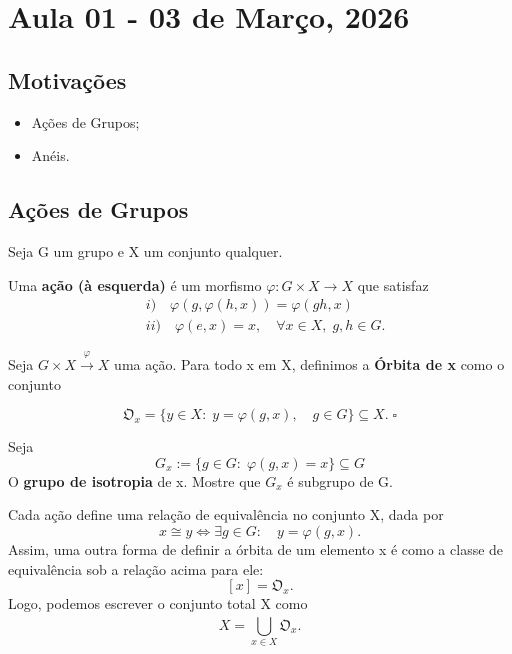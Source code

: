 \documentclass[../algebraIII_notes.tex]{subfiles}
\begin{document}
\section{Aula 01 - 03 de Março, 2026}
\subsection{Motivações}
\begin{itemize}
	\item Ações de Grupos;
	\item Anéis.
\end{itemize}
\subsection{Ações de Grupos}
Seja G um grupo e X um conjunto qualquer.
\begin{def*}
	Uma \textbf{ação (à esquerda)} é um morfismo \(\varphi :G\times X\rightarrow X\) que satisfaz
	\begin{align*}
		 & i)\quad \varphi (g, \varphi (h, x)) = \varphi (gh, x)         \\
		 & ii)\quad \varphi (e, x)=x, \quad \forall x\in X,\; g, h\in G.
	\end{align*}
\end{def*}
\begin{def*}
	Seja \(G\times X \stackrel{\varphi }\rightarrow X\) uma ação. Para todo x em X, definimos a \textbf{Órbita de x} como o conjunto

	\[
		\mathfrak{O}_{x} = \{y\in X:\; y = \varphi (g, x),\quad g\in G\}\subseteq X. \;\square
	\]
\end{def*}
\begin{exr}
	Seja
	\[
		G_{x}:=\{g\in G:\; \varphi (g, x)=x\}\subseteq G
	\]
	O \textbf{grupo de isotropia} de x.
	Mostre que \(G_{x}\) é subgrupo de G.
\end{exr}
Cada ação define uma relação de equivalência no conjunto X, dada por
\[
	x \cong y \Longleftrightarrow \exists g\in G:\quad y = \varphi (g, x).
\]
Assim, uma outra forma de definir a órbita de um elemento x é como a classe de equivalência sob a relação acima para ele:
\[
	[x] = \mathfrak{O}_{x}.
\]
Logo, podemos escrever o conjunto total X como
\[
	X = \bigcup_{x\in X}^{}\mathfrak{O}_{x}.
\]
\end{document}
